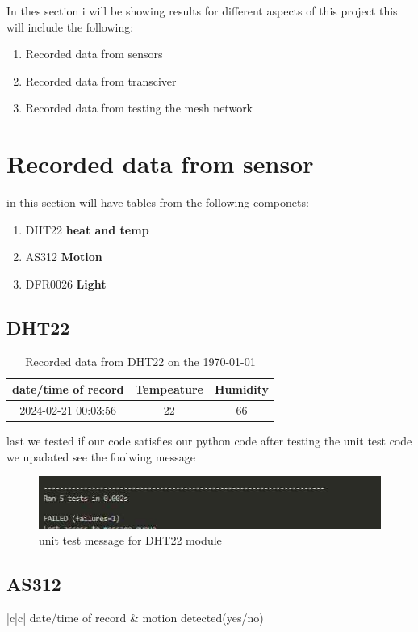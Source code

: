 In thes section i will  be showing results for  different aspects of this project this  will  include the following:
\begin{enumerate}
    \item Recorded data from sensors
    \item Recorded data from transciver
    \item Recorded data from  testing the mesh network
\end{enumerate}
\section{Recorded data from sensor}
in this section  will have  tables from the following componets:
\begin{enumerate}
    \item DHT22 \textbf{heat and temp}
    \item AS312 \textbf{Motion }
    \item DFR0026 \textbf{Light}
\end{enumerate}
\subsection{DHT22}
\begin{table}
    \begin{tabular}{|c|c|c|}
        \hline
        date/time of record & Tempeature &Humidity \\
        \hline\hline
        2024-02-21 00:03:56&22& 66 \\
    \end{tabular}
    \caption{Recorded data from  DHT22 on the \today}
    \label*{Recorded data from  DHT22 on the \today}
\end{table}
last we tested if our code  satisfies our  python code after testing the unit test code we upadated see the foolwing message
\begin{figure}[h!]
    \centering
    \includegraphics*[width=0.5\linewidth]{Images/unit_testoutput.jpg}
    \caption*{unit test message for DHT22 module}
    \label{unit test message for DHT22 module}
\end{figure}
\subsection*{AS312}
\begin{table}
    \begin{tabular*}{|c|c|}
        date/time of record & motion detected(yes/no)
    \end{tabular*}
    \caption*{Recorded data from  AS312 on the \today}
    \label*{Recorded data from  AS312 on the \today}
\end{table}
